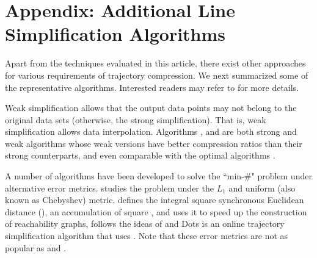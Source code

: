 \section*{Appendix: Additional Line Simplification Algorithms}
Apart from the techniques evaluated in this article, there exist other approaches for various requirements of trajectory compression.
We next summarized some of the representative \lsa algorithms. Interested readers may refer to \cite{Shi:Survey, Muckell:Compression, Lin:Cised, Zhang:Evaluation} for more details. %





Weak simplification allows that the output data points may not belong to the original data sets \cite{Trajcevski:DDR} (otherwise, the strong simplification).
That is, weak simplification allows data interpolation. Algorithms \sleeve \cite{Zhao:Sleeve}, \operb\cite{Lin:Operb} and \cised \cite{Lin:Cised} are both strong and weak \lsa algorithms whose weak versions have better compression ratios than their strong counterparts, and even comparable with the optimal algorithms \cite{Lin:Cised}.

A number of algorithms \cite{Agarwal:Metric, Chen:Fast, Wu:Graph,Cao:Dots} have been developed to solve the ``min-\#" problem under alternative error metrics.
\cite{Agarwal:Metric} studies the problem under the $L_1$ and uniform (also known as Chebyshev) metric. %
\cite{Chen:Fast} defines  the integral square synchronous Euclidean distance (), an accumulation of square \sed, and uses it to speed up the construction of reachability graphs, \cite{Wu:Graph} follows the ideas of \cite{Chen:Fast} and Dots \cite{Cao:Dots} is an online  trajectory simplification algorithm that uses .
Note that these error metrics are not as popular as \ped and \sed.



